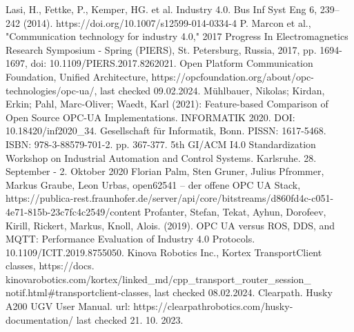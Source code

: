 \documentclass[conference]{IEEEtran}
\begin{document}
\begin{thebibliography}{00}
Lasi, H., Fettke, P., Kemper, HG. et al. Industry 4.0. Bus Inf Syst Eng 6, 239–242 (2014). https://doi.org/10.1007/s12599-014-0334-4
 P. Marcon et al., "Communication technology for industry 4.0," 2017 Progress In Electromagnetics Research Symposium - Spring (PIERS), St. Petersburg, Russia, 2017, pp. 1694-1697, doi: 10.1109/PIERS.2017.8262021.
Open Platform Communication Foundation, Unified Architecture, https://opcfoundation.org/about/opc-technologies/opc-ua/, last checked 09.02.2024.
Mühlbauer, Nikolas; Kirdan, Erkin; Pahl, Marc-Oliver; Waedt, Karl (2021): Feature-based Comparison of Open Source OPC-UA Implementations. INFORMATIK 2020. DOI: 10.18420/inf2020\_34. Gesellschaft für Informatik, Bonn. PISSN: 1617-5468. ISBN: 978-3-88579-701-2. pp. 367-377. 5th GI/ACM I4.0 Standardization Workshop on Industrial Automation and Control Systems. Karlsruhe. 28. September - 2. Oktober 2020
Florian Palm, Sten Gruner, Julius Pfrommer, Markus Graube, Leon Urbas, open62541 – der offene OPC UA Stack, https://publica-rest.fraunhofer.de/server/api/core/bitstreams/d860fd4c-c051-4e71-815b-23c7fc4c2549/content
 Profanter, Stefan, Tekat, Ayhun, Dorofeev, Kirill, Rickert, Markus, Knoll, Alois. (2019). OPC UA versus ROS, DDS, and MQTT: Performance Evaluation of Industry 4.0 Protocols. 10.1109/ICIT.2019.8755050. 
 Kinova Robotics Inc., Kortex TransportClient classes, https://docs.\\kinovarobotics.com/kortex/linked\_md/cpp\_transport\_router\_session\_\\notif.html\#transportclient-classes, last checked 08.02.2024.
 Clearpath. Husky A200 UGV User Manual. url: https://clearpathrobotics.com/husky-documentation/ last checked 21. 10. 2023.
\end{thebibliography}
\end{document}
